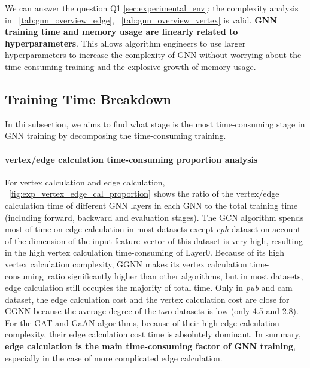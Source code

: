 We can answer the question Q1 \ref{sec:experimental_env}: the complexity analysis in \tablename~\ref{tab:gnn_overview_edge}, \tablename~\ref{tab:gnn_overview_vertex} is valid. 
\textbf{GNN training time and memory usage are linearly related to hyperparameters}.
This allows algorithm engineers to use larger hyperparameters to increase the complexity of GNN without worrying about the time-consuming training and the explosive growth of memory usage.

\subsection{Training Time Breakdown}
\label{sec:training_time_breakdown}

In thi subsection, we aims to find what stage is the most time-consuming stage in GNN training by decomposing the time-consuming training.

\paragraph{vertex/edge calculation time-consuming proportion analysis}

For vertex calculation and edge calculation, \figurename~\ref{fig:exp_vertex_edge_cal_proportion} shows the ratio of the vertex/edge calculation time of different GNN layers in each GNN
to the total training time (including forward, backward and evaluation stages). 
The GCN algorithm spends most of time on edge calculation in most datasets except \textit{cph} dataset on account of
the dimension of the input feature vector of this dataset is very high, resulting in the high vertex calculation time-consuming of Layer0.
Because of its high vertex calculation complexity, GGNN makes its vertex calculation time-consuming\
ratio significantly higher than other algorithms, but in most datasets, edge calculation still occupies the majority of total time. 
Only in \textit{pub} and cam dataset, the edge calculation cost and the vertex calculation cost are close for GGNN 
because the average degree of the two datasets is low (only 4.5 and 2.8).
For the GAT and GaAN algorithms, because of their high edge calculation complexity, their edge calculation cost time is absolutely dominant. 
In summary, \textbf{edge calculation is the main time-consuming factor of GNN training}, especially in the case of more complicated edge calculation.

